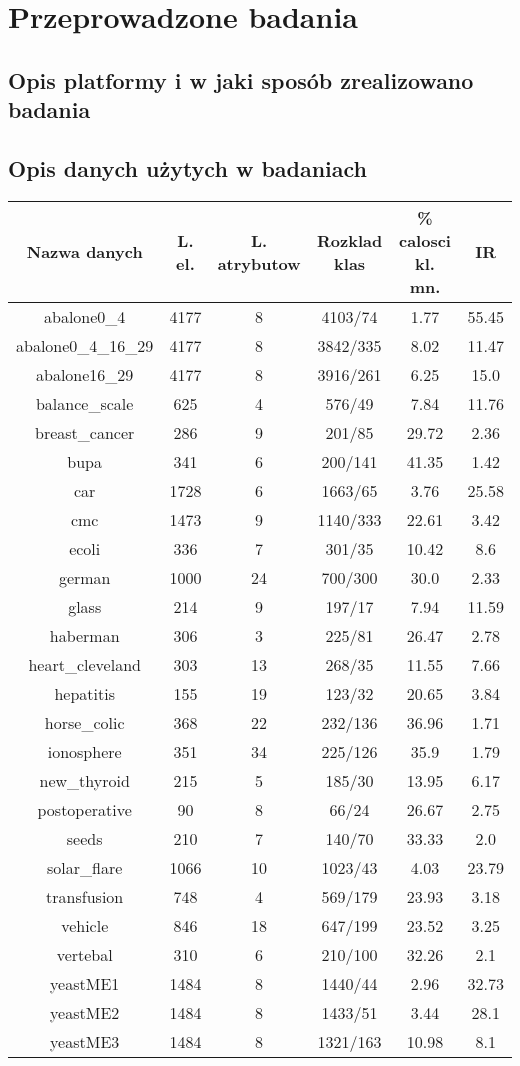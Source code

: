 
\chapter{Przeprowadzone badania}

\section{Opis platformy i w jaki sposób zrealizowano badania}

\section{Opis danych użytych w badaniach}

\begin{tabular}{|c|c|c|c|c|c|}%
	\hline%
	Nazwa danych&L. el.&L. atrybutow&Rozklad klas&\% calosci kl. mn.&IR\\%
	\hline%
	abalone0\_4&4177&8&4103/74&1.77&55.45\\%
	\hline%
	abalone0\_4\_16\_29&4177&8&3842/335&8.02&11.47\\%
	\hline%
	abalone16\_29&4177&8&3916/261&6.25&15.0\\%
	\hline%
	balance\_scale&625&4&576/49&7.84&11.76\\%
	\hline%
	breast\_cancer&286&9&201/85&29.72&2.36\\%
	\hline%
	bupa&341&6&200/141&41.35&1.42\\%
	\hline%
	car&1728&6&1663/65&3.76&25.58\\%
	\hline%
	cmc&1473&9&1140/333&22.61&3.42\\%
	\hline%
	ecoli&336&7&301/35&10.42&8.6\\%
	\hline%
	german&1000&24&700/300&30.0&2.33\\%
	\hline%
	glass&214&9&197/17&7.94&11.59\\%
	\hline%
	haberman&306&3&225/81&26.47&2.78\\%
	\hline%
	heart\_cleveland&303&13&268/35&11.55&7.66\\%
	\hline%
	hepatitis&155&19&123/32&20.65&3.84\\%
	\hline%
	horse\_colic&368&22&232/136&36.96&1.71\\%
	\hline%
	ionosphere&351&34&225/126&35.9&1.79\\%
	\hline%
	new\_thyroid&215&5&185/30&13.95&6.17\\%
	\hline%
	postoperative&90&8&66/24&26.67&2.75\\%
	\hline%
	seeds&210&7&140/70&33.33&2.0\\%
	\hline%
	solar\_flare&1066&10&1023/43&4.03&23.79\\%
	\hline%
	transfusion&748&4&569/179&23.93&3.18\\%
	\hline%
	vehicle&846&18&647/199&23.52&3.25\\%
	\hline%
	vertebal&310&6&210/100&32.26&2.1\\%
	\hline%
	yeastME1&1484&8&1440/44&2.96&32.73\\%
	\hline%
	yeastME2&1484&8&1433/51&3.44&28.1\\%
	\hline%
	yeastME3&1484&8&1321/163&10.98&8.1\\%
	\hline%
\end{tabular}%

